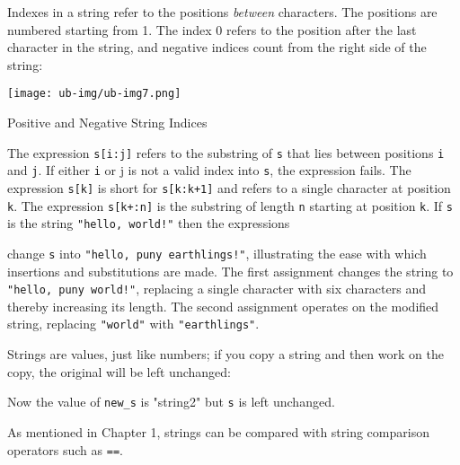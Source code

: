 Indexes in a string refer to the positions
{\em between\/} characters. The positions are numbered starting from 1. The
index 0 refers to the position after the last character in the string,
and negative indices count from the right side of the string:


\begin{center}
\texttt{[image: ub-img/ub-img7.png]}
\end{center}
\vspace{-0.25cm}{\sffamily\bfseries Figure 3-1:}
{\sffamily Positive and Negative String Indices}

\bigskip

The expression \texttt{s[i:j]} refers to the
substring of \texttt{s} that lies between positions
\texttt{i} and \texttt{j}. If either \texttt{i} or j is not a valid
index into \texttt{s}, the expression fails. The expression
\texttt{s[k]} is short for \texttt{s[k:k+1]} and refers to a single
character at position \texttt{k}. The expression
\texttt{s[k+:n]} is the substring of length \texttt{n} starting at
position \texttt{k}. If \texttt{s} is the string
\texttt{"hello, world!"} then the
expressions


\noindent
change \texttt{s} into \texttt{"hello, puny
earthlings!"}, illustrating the ease with which
insertions and substitutions are made. The first assignment changes the
string to \texttt{"hello, puny world!"},
replacing a single character with six characters and thereby increasing
its length. The second assignment operates on the modified string,
replacing \texttt{"world"} with
\texttt{"earthlings"}.

Strings are values, just like numbers; if you copy a string and then
work on the copy, the original will be left unchanged:


Now the value of \texttt{new\_s} is
"string2" but \texttt{s} is left unchanged.

As mentioned in Chapter 1, strings can be compared with string
comparison operators such as
\texttt{==}.


